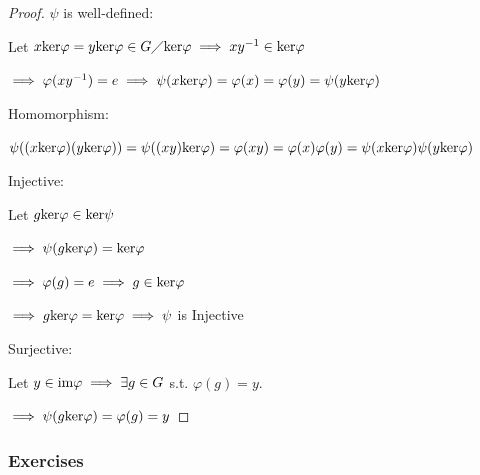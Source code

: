 \newpage
{}

\begin{proof}
    $\psi$ is well-defined:

    Let $x\text{ker}\varphi=y\text{ker}\varphi\in G\diagup\text{ker}\varphi \implies xy^{-1}\in \text{ker}\varphi$

    $\implies \varphi(xy^{-1})=e \implies \psi(x\text{ker}\varphi)=\varphi(x)=\varphi(y)=\psi(y\text{ker}\varphi)$

    Homomorphism:

    $\psi((x\text{ker}\varphi)(y\text{ker}\varphi))=\psi((xy)\text{ker}\varphi)=\varphi(xy)=\varphi(x)\varphi(y)
    =\psi(x\text{ker}\varphi)\psi(y\text{ker}\varphi)$

    Injective:

    Let $g\text{ker}\varphi \in \text{ker}\psi$

    $\implies \psi(g\text{ker}\varphi)=\text{ker}\varphi$

    $\implies \varphi(g)=e \implies g \in \text{ker}\varphi$

    $\implies g\text{ker}\varphi=\text{ker}\varphi \implies \psi$ is Injective

    Surjective:

    Let $y \in \text{im}\varphi \implies \exists g\in G$ s.t. $\varphi(g)=y$.

    $\implies \psi(g\text{ker}\varphi)=\varphi(g)=y$
\end{proof}

\newpage
\subsubsection{Exercises}

